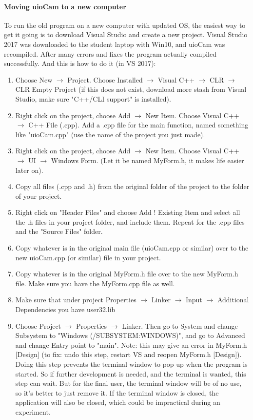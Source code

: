 \documentclass[]{book}
\begin{document}
	\paragraph{Moving uioCam to a new computer}
	To run the old program on a new computer with updated OS, the easiest way to get it going is to download Visual Studio and create a new project. Visual Studio 2017 was downloaded to the student laptop with Win10, and uioCam was recompiled. After many errors and fixes the program actually compiled successfully. And this is how to do it (in VS 2017):
	\begin{enumerate}
		\item Choose New $\rightarrow$ Project. Choose Installed $\rightarrow$ Visual C++ $\rightarrow$ CLR $\rightarrow$ CLR Empty Project (if this does not exist, download more stash from Visual Studio, make sure "C++/CLI support" is installed).
		\item Right click on the project, choose Add $\rightarrow$ New Item. Choose Visual C++ $\rightarrow$ C++ File (.cpp). Add a .cpp file for the main function, named something like "uioCam.cpp" (use the name of the project you just made).
		\item Right click on the project, choose Add $\rightarrow$ New Item. Choose Visual C++ $\rightarrow$ UI $\rightarrow$ Windows Form. (Let it be named MyForm.h, it makes life easier later on).
		\item Copy all files (.cpp and .h) from the original folder of the project to the folder of your project.
		\item Right click on "Header Files" and choose Add ! Existing Item and select all the .h files in your project folder, and include them. Repeat for the .cpp files and the "Source Files" folder.
		\item Copy whatever is in the original main file (uioCam.cpp or similar) over to the new uioCam.cpp (or similar) file in your project.
		\item Copy whatever is in the original MyForm.h file over to the new MyForm.h file. Make sure you have the MyForm.cpp file as well.
		\item Make sure that under project Properties $\rightarrow$ Linker $\rightarrow$ Input $\rightarrow$ Additional Dependencies you have user32.lib
		\item Choose Project $\rightarrow$ Properties $\rightarrow$ Linker. Then go to System and change Subsystem to "Windows (/SUBSYSTEM:WINDOWS)", and go to Advanced and change Entry point to "main".
		Note: this may give an error in MyForm.h [Design] (to fix: undo this step, restart VS and reopen MyForm.h [Design]). Doing this step prevents the terminal window to pop up when the program is started. So if further development is needed, and the terminal is wanted, this step can wait. But for the final user, the terminal window will be of no use, so it’s better to just remove it. If the terminal window is closed, the application will also be closed, which could be impractical during an experiment.
	\end{enumerate}
\end{document}
